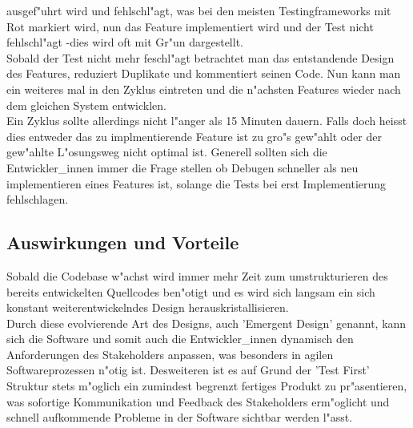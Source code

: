     ausgef"uhrt wird und fehlschl"agt, was bei den meisten Testingframeworks mit 
    Rot markiert wird, nun das Feature implementiert wird und der Test nicht 
    fehlschl"agt -dies wird oft mit Gr"un dargestellt.\\
    Sobald der Test nicht mehr feschl"agt betrachtet man das entstandende Design 
    des Features, reduziert Duplikate und kommentiert seinen Code. Nun kann man 
    ein weiteres mal in den Zyklus eintreten und die n"achsten Features wieder 
    nach dem gleichen System entwicklen.\\
    Ein Zyklus sollte allerdings nicht l"anger als 15 Minuten dauern. Falls doch
    heisst dies entweder das zu implmentierende Feature ist zu gro"s gew"ahlt
    oder der gew"ahlte L"osungsweg nicht optimal ist. Generell 
    sollten sich die Entwickler\_innen immer die Frage stellen ob Debugen 
    schneller als neu implementieren eines Features ist, solange die Tests bei erst
    Implementierung fehlschlagen.

  \subsection{Auswirkungen und Vorteile}
    Sobald die Codebase w"achst wird immer mehr Zeit zum umstrukturieren des 
    bereits entwickelten Quellcodes ben"otigt und es wird sich langsam ein 
    sich konstant weiterentwickelndes Design herauskristallisieren.\\
    Durch diese evolvierende Art des Designs, auch 'Emergent Design'\cite[p.~4]{Chelimsky:2010} genannt, kann sich die Software und somit auch die 
    Entwickler\_innen dynamisch den Anforderungen des Stakeholders anpassen, was 
    besonders in agilen Softwareprozessen n"otig ist. Desweiteren ist es auf 
    Grund der 'Test First' Struktur stets m"oglich ein zumindest begrenzt 
    fertiges Produkt zu pr"asentieren, was sofortige Kommunikation und Feedback
    des Stakeholders erm"oglicht und schnell aufkommende Probleme in der Software
    sichtbar werden l"asst.\\

